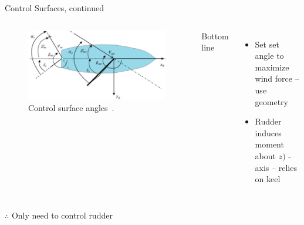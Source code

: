 \documentclass[10pt,xcolor={table,dvipsnames},t]{beamer}
\begin{document}
\begin{frame}{Control Surfaces, continued}
    \begin{columns}
    \begin{figure}
        \centering
        \includegraphics{documents/figures/alves_sailboat_angles.png}
        \caption{Control surface angles~\cite{Alves2010}.}
        \label{fig:my_label}
    \end{figure}
    \centerline{Bottom line}
    \begin{itemize}
        \item Set set angle to maximize wind force -- use geometry
        \item Rudder induces moment about \(z)\) - axis -- relies on keel
    \end{itemize}

    \end{columns}
    \centerline{\(\therefore\) Only need to control rudder}
\end{frame}
\end{document}
